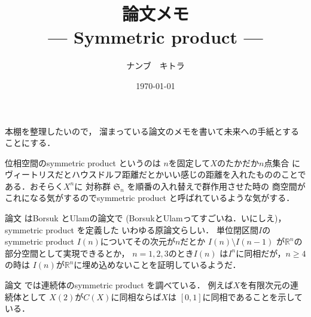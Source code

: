\documentclass[leqno, a4paper, 12pt]{jsarticle}
\title{論文メモ
\large{\\--- Symmetric product ---}
}
\author{ナンブ　キトラ}
\date{\today}
\newcommand{\rr}{\mathbb{R}}
\begin{document}
\maketitle

本棚を整理したいので，
溜まっている論文のメモを書いて未来への手紙とすることにする．

位相空間のsymmetric product というのは
$n$を固定して$X$のたかだか$n$点集合
にヴィートリスだとハウスドルフ距離だとかいい感じの距離を入れたもののことである．おそらく$X^{n}$に
対称群
$\mathfrak{S}_{n}$
を順番の入れ替えで群作用させた時の
商空間がこれになる気がするのでsymmetric product と呼ばれているような気がする．

論文
\cite{MR1562283}
はBorsuk とUlamの論文で
(BorsukとUlamってすごいね．いにしえ)，
symmetric product を定義した
いわゆる原論文らしい．
単位閉区間$I$のsymmetric product 
$I(n)$についてその次元が$n$だとか
$I(n)\setminus I(n-1)$
が$\rr^{n}$の部分空間として実現できるとか，
$n=1,2, 3$のとき$I(n)$
は$I^{n}$に同相だが，$n\ge 4$の時は
$I(n)$が$\rr^{n}$に埋め込めないことを証明しているようだ．


論文
\cite{MR1669815}
では連続体のsymmetric product 
を調べている．
例えば$X$を有限次元の連続体として
$X(2)$が$C(X)$に同相ならば$X$は
$[0, 1]$に同相であることを示している．
\nocite{*}


\end{document}
